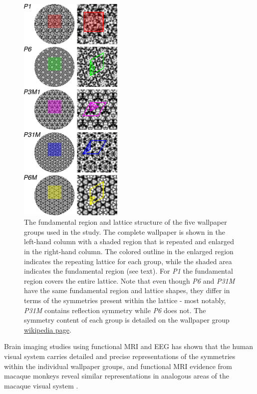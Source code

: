 \documentclass[11pt, twoside]{article}
\begin{document}
\begin{figure}
	\centering
	\includegraphics[width=0.44\textwidth]{./figures/wpg_structure.pdf}
	\caption{The fundamental region and lattice structure of the five wallpaper groups used in the study. The complete wallpaper is shown in the left-hand column with a shaded region that is repeated and enlarged in the right-hand column. The colored outline in the enlarged region indicates the repeating lattice for each group, while the shaded area indicates the fundamental region (see text). For \textit{P1} the fundamental region covers the entire lattice. Note that even though \textit{P6} and \textit{P31M} have the same fundamental region and lattice shapes, they differ in terms of the symmetries present within the lattice - most notably, \textit{P31M} contains reflection symmetry while \textit{P6} does not. The symmetry content of each group is detailed on the wallpaper group \href{https://en.wikipedia.org/wiki/Wallpaper_group}{wikipedia page}.}
	\label{fig:wpg_structure}
\end{figure}
Brain imaging studies using functional MRI \citep{RN1725} and EEG \citep{RN1959,kohler_clarke_2021} has shown that the human visual system carries detailed and precise representations of the symmetries within the individual wallpaper groups, and functional MRI evidence from macaque monkeys reveal similar representations in analogous areas of the macaque visual system \citep{audurier_symmetry_2021}.
\end{document}
